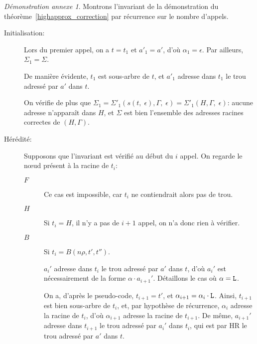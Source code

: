 \documentclass[11pt,a4paper]{article}
\theoremstyle{plain}
\theoremstyle{definition}
\theoremstyle{remark}
\newtheorem{demonstrationappendix}{Démonstration annexe}
\newcommand*{\sequent}{\Gamma}
\newcommand*{\Left}{\textnormal{\texttt{L}}}
\newcommand*{\unknown}{H}
\newcommand*{\highapprox}{\ensuremath{\Sigma_1}}
\newcommand*{\highapproxspec}{\ensuremath{\Sigma'_1}}
\newcommand*{\treesimplify}{\ensuremath{s}}
\begin{document}
\begin{demonstrationappendix}
    \label{highapprox_correction_proof}
    Montrons l'invariant de la démonstration du théorème~\ref{highapprox_correction} par récurrence sur le nombre d'appels.

    \begin{description}
        \item[Initialisation:]
            Lors du premier appel, on a $t = t_1$ et $a'_1 = a'$, d'où $\alpha_1 = \epsilon$. Par ailleurs, $\highapprox = \Sigma$. 
    
            De manière évidente, $t_1$ est sous-arbre de $t$, et $a'_1$ adresse dans $t_1$ le trou adressé par $a'$ dans $t$.
            
            On vérifie de plus que $\highapprox = \highapproxspec \left( \treesimplify( t, \; \epsilon ), \sequent, \; \epsilon \right) = \highapproxspec \left( H, \sequent, \; \epsilon \right)$: aucune adresse n'apparaît dans $\unknown$, et $\Sigma$ est bien l'ensemble des adresses racines correctes de $(\unknown, \sequent)$.

        \item[Hérédité:] Supposons que l'invariant est vérifié au début du $i$\ieme{} appel. On regarde le n\oe ud présent à la racine de $t_i$:

        \begin{description}
            \item[$F$]
                Ce cas est impossible, car $t_i$ ne contiendrait alors pas de trou.
                
            \item[$H$]
                Si $t_i = H$, il n'y a pas de $i+1$\ieme{} appel, on n'a donc rien à vérifier. 

            \item[$B$] Si $t_i = B(n\rho, t', t'')$.

            $a_i'$ adresse dans $t_i$ le trou adressé par $a'$ dans $t$, d'où $a_i'$ est nécessairement de la forme $\alpha \cdot a_{i+1}'$. Détaillons le cas où $\alpha = \Left$.

            On a, d'après le pseudo-code, $t_{i+1} = t'$, et $\alpha_{i+1} = \alpha_i \cdot \Left$. Ainsi, $t_{i+1}$ est bien sous-arbre de $t_i$, et, par hypothèse de récurrence, $\alpha_i$ adresse la racine de $t_i$, d'où $\alpha_{i+1}$ adresse la racine de $t_{i+1}$. De même, $a_{i+1}'$ adresse dans $t_{i+1}$ le trou adressé par $a_i'$ dans $t_i$, qui est par HR le trou adressé par $a'$ dans $t$.
            

\end{description}
\end{description}
\end{demonstrationappendix}
\end{document}
